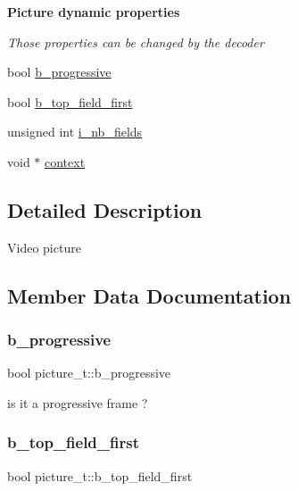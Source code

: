\begin{Indent}\textbf{ Picture dynamic properties}\par
{\em Those properties can be changed by the decoder }\begin{DoxyCompactItemize}
\item 
bool \hyperlink{structpicture__t_a479a8722843907e92418b6c9186f30ee}{b\+\_\+progressive}
\item 
bool \hyperlink{structpicture__t_a21c778fba96912ad30bd8b6242ce5f99}{b\+\_\+top\+\_\+field\+\_\+first}
\item 
unsigned int \hyperlink{structpicture__t_a0a35d4f969c33945d785743de590e5d5}{i\+\_\+nb\+\_\+fields}
\item 
void $\ast$ \hyperlink{structpicture__t_a3c8b72660e630a92591a2798ad2d0661}{context}
\end{DoxyCompactItemize}
\end{Indent}


\subsection{Detailed Description}
Video picture 

\subsection{Member Data Documentation}
\mbox{\label{structpicture__t_a479a8722843907e92418b6c9186f30ee}} 
\subsubsection{\texorpdfstring{b\+\_\+progressive}{b\_progressive}}
{\footnotesize\ttfamily bool picture\+\_\+t\+::b\+\_\+progressive}

is it a progressive frame ? \mbox{\label{structpicture__t_a21c778fba96912ad30bd8b6242ce5f99}} 
\subsubsection{\texorpdfstring{b\+\_\+top\+\_\+field\+\_\+first}{b\_top\_field\_first}}
{\footnotesize\ttfamily bool picture\+\_\+t\+::b\+\_\+top\+\_\+field\+\_\+first}

